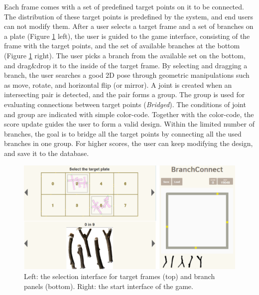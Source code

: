 Each frame comes with a set of predefined target points on it to be connected.
The distribution of these target points is predefined by the system, and end users can not modify them.
After a user selects a target frame and a set of branches on a plate (Figure \ref{fig:game_interface} left), the user is guided to the game interface, consisting of the frame with the target points, and the set of available branches at the bottom (Figure \ref{fig:game_interface} right).
The user picks a branch from the available set on the bottom, and drag\&drop it to the inside of the target frame.
By selecting and dragging a branch, the user searches a good 2D pose through geometric manipulations such as move, rotate, and horizontal flip (or mirror).
A joint is created when an intersecting pair is detected, and the pair forms a group.
The group is used for evaluating connections between target points (\textit{Bridged}).
The conditions of joint and group are indicated with simple color-code.
Together with the color-code, the score update guides the user to form a valid design.
Within the limited number of branches, the goal is to bridge all the target points by connecting all the used branches in one group.
For higher scores, the user can keep modifying the design, and save it to the database.

\begin{figure}[ht]
  \begin{center}
    \includegraphics[width = 0.4\paperwidth]{images/interface/game_interface.png}
    \caption{Left: the selection interface for target frames (top) and branch panels (bottom). Right: the start interface of the game.}
    \label{fig:game_interface}
  \end{center}
\end{figure}
%
